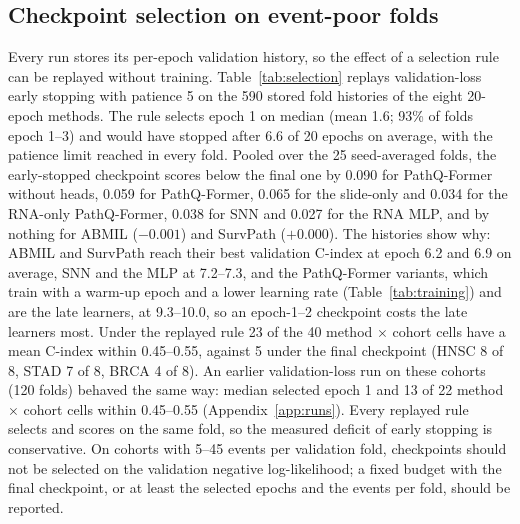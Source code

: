 \documentclass{article}
\newcommand{\pq}{PathQ-Former}
\newcommand{\cindex}{C-index}
\begin{document}
\subsection{Checkpoint selection on event-poor folds}
\label{sec:selection}
Every run stores its per-epoch validation history, so the effect of a selection rule can be replayed without training. Table~\ref{tab:selection} replays validation-loss early stopping with patience 5 on the 590 stored fold histories of the eight 20-epoch methods. The rule selects epoch 1 on median (mean 1.6; 93\% of folds epoch 1--3) and would have stopped after 6.6 of 20 epochs on average, with the patience limit reached in every fold. Pooled over the 25 seed-averaged folds, the early-stopped checkpoint scores below the final one by 0.090 for \pq{} without heads, 0.059 for \pq{}, 0.065 for the slide-only and 0.034 for the RNA-only \pq{}, 0.038 for SNN and 0.027 for the RNA MLP, and by nothing for ABMIL ($-0.001$) and SurvPath ($+0.000$). The histories show why: ABMIL and SurvPath reach their best validation \cindex{} at epoch 6.2 and 6.9 on average, SNN and the MLP at 7.2--7.3, and the \pq{} variants, which train with a warm-up epoch and a lower learning rate (Table~\ref{tab:training}) and are the late learners, at 9.3--10.0, so an epoch-1--2 checkpoint costs the late learners most. Under the replayed rule 23 of the 40 method $\times$ cohort cells have a mean \cindex{} within 0.45--0.55, against 5 under the final checkpoint (HNSC 8 of 8, STAD 7 of 8, BRCA 4 of 8). An earlier validation-loss run on these cohorts (120 folds) behaved the same way: median selected epoch 1 and 13 of 22 method $\times$ cohort cells within 0.45--0.55 (Appendix~\ref{app:runs}). Every replayed rule selects and scores on the same fold, so the measured deficit of early stopping is conservative. On cohorts with 5--45 events per validation fold, checkpoints should not be selected on the validation negative log-likelihood; a fixed budget with the final checkpoint, or at least the selected epochs and the events per fold, should be reported.
\end{document}
